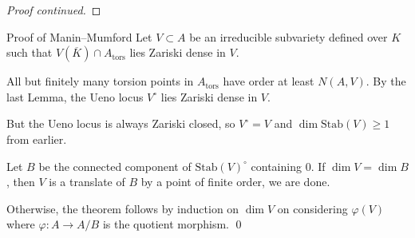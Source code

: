 \documentclass{beamer}
\begin{document}
\begin{frame}
  \begin{proof}[Proof continued]
    \vspace{6cm}



  \end{proof}

\end{frame}

\begin{frame}{Proof of Manin--Mumford}
  Let $V\subset A$ be an irreducible subvariety defined over $K$
  such that $V(\overline K)\cap A_{\mathrm{tors}}$ lies Zariski dense
  in $V$. 
  
  All but finitely many torsion
  points in $A_{\mathrm{tors}}$ have order at least $N(A,V)$.  
  By the last Lemma,
  the Ueno locus $V^{\circ}$ lies Zariski dense in $V$.

  But the Ueno locus is always Zariski closed, so 
  $V^{\circ}=V$ and
  $\dim \mathrm{Stab}(V) \ge 1$ from earlier.

  Let $B$ be the connected component of $\mathrm{Stab}(V)^{\circ}$
  containing $0$.
  If $\dim V = \dim B$, then $V$ is a translate of $B$ by a point of
  finite order, we are done.

  Otherwise, the theorem follows by induction on $\dim V$ on
  considering
  $\varphi(V)$ where 
    $\varphi\colon A\rightarrow A/B$ is the quotient morphism. \qed
\end{frame}
\end{document}
